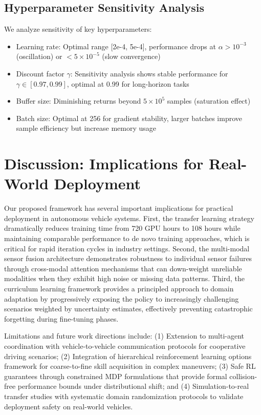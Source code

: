 \documentclass[10pt,twocolumn,letterpaper]{article}
\begin{document}
\subsection{Hyperparameter Sensitivity Analysis}

We analyze sensitivity of key hyperparameters:
\begin{itemize}
    \item Learning rate: Optimal range [2e-4, 5e-4], performance drops at $\alpha > 10^{-3}$ (oscillation) or $< 5\times10^{-5}$ (slow convergence)
    \item Discount factor $\gamma$: Sensitivity analysis shows stable performance for $\gamma \in [0.97, 0.99]$, optimal at 0.99 for long-horizon tasks
    \item Buffer size: Diminishing returns beyond $5\times10^5$ samples (saturation effect)
    \item Batch size: Optimal at 256 for gradient stability, larger batches improve sample efficiency but increase memory usage
\end{itemize}

\section{Discussion: Implications for Real-World Deployment}

Our proposed framework has several important implications for practical deployment in autonomous vehicle systems. First, the transfer learning strategy dramatically reduces training time from 720 GPU hours to 108 hours while maintaining comparable performance to de novo training approaches, which is critical for rapid iteration cycles in industry settings. Second, the multi-modal sensor fusion architecture demonstrates robustness to individual sensor failures through cross-modal attention mechanisms that can down-weight unreliable modalities when they exhibit high noise or missing data patterns. Third, the curriculum learning framework provides a principled approach to domain adaptation by progressively exposing the policy to increasingly challenging scenarios weighted by uncertainty estimates, effectively preventing catastrophic forgetting during fine-tuning phases.

Limitations and future work directions include: (1) Extension to multi-agent coordination with vehicle-to-vehicle communication protocols for cooperative driving scenarios; (2) Integration of hierarchical reinforcement learning options framework for coarse-to-fine skill acquisition in complex maneuvers; (3) Safe RL guarantees through constrained MDP formulations that provide formal collision-free performance bounds under distributional shift; and (4) Simulation-to-real transfer studies with systematic domain randomization protocols to validate deployment safety on real-world vehicles.
\end{document}
